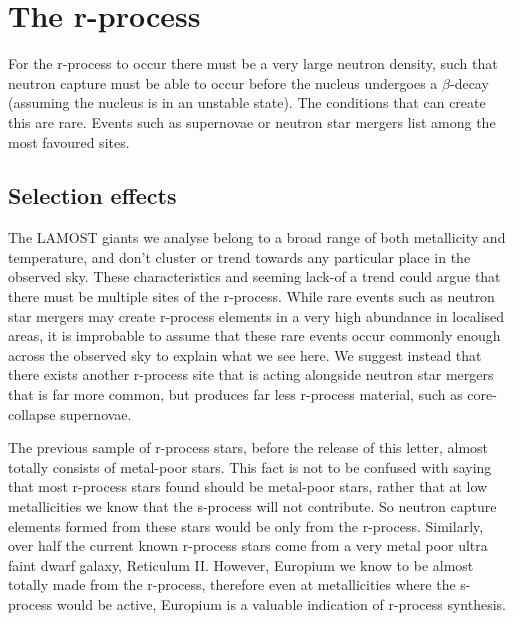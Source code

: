 \documentclass[a4paper,fleqn,usenatbib]{mnras}
\begin{document}
	\section{The r-process}
	For the r-process to occur there must be a very large neutron density, such that neutron capture must be able to occur before the nucleus undergoes a $\beta$-decay (assuming the nucleus is in an unstable state). The conditions that can create this are rare. Events such as supernovae or neutron star mergers list among the most favoured sites.
	
	\subsection{Selection effects}
	The LAMOST giants we analyse belong to a broad range of both metallicity and temperature, and don't cluster or trend towards any particular place in the observed sky. These characteristics and seeming lack-of a trend could argue that there must be multiple sites of the r-process. While rare events such as neutron star mergers may create r-process elements in a very high abundance in localised areas, it is improbable to assume that these rare events occur commonly enough across the observed sky to explain what we see here. We suggest instead that there exists another r-process site that is acting alongside neutron star mergers that is far more common, but produces far less r-process material, such as core-collapse supernovae.
	
	The previous sample of r-process stars, before the release of this letter, almost totally consists of metal-poor stars. This fact is not to be confused with saying that most r-process stars found should be metal-poor stars, rather that at low metallicities we know that the s-process will not contribute. So neutron capture elements formed from these stars would be only from the r-process. Similarly, over half the current known r-process stars come from a very metal poor ultra faint dwarf galaxy, Reticulum II. However, Europium we know to be almost totally made from the r-process, therefore even at metallicities where the s-process would be active, Europium is a valuable indication of r-process synthesis. 
	
\end{document}
